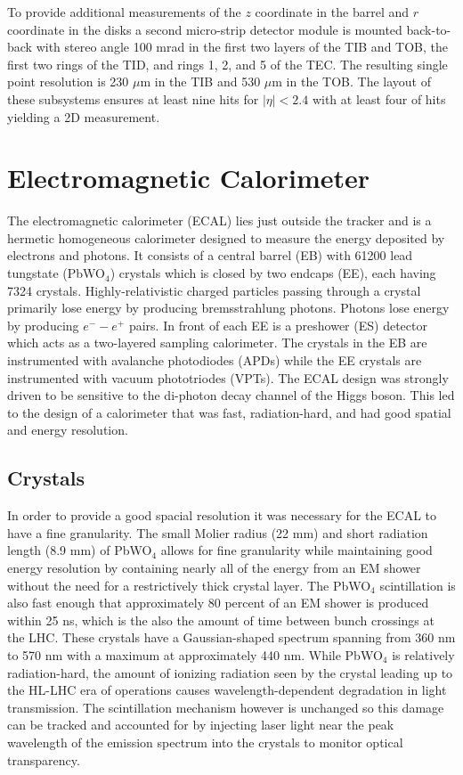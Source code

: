 To provide additional measurements of the $z$ coordinate in the barrel and $r$ coordinate in the disks a second micro-strip detector module is mounted back-to-back with stereo angle 100 mrad in the first two layers of the TIB and TOB, the first two rings of the TID, and rings 1, 2, and 5 of the TEC.  The resulting single point resolution is 230 $\mu$m in the TIB and 530 $\mu$m in the TOB.  The layout of these subsystems ensures at least nine hits for $|\eta| < 2.4$ with at least four of hits yielding a 2D measurement.



\section{Electromagnetic Calorimeter}

The electromagnetic calorimeter (ECAL) lies just outside the tracker and is a hermetic homogeneous calorimeter designed to measure the energy deposited by electrons and photons.  It consists of a central barrel (EB) with 61200 lead tungstate (PbWO$_{4}$) crystals which is closed by two endcaps (EE), each having 7324 crystals.  Highly-relativistic charged particles passing through a crystal primarily lose energy by producing bremsstrahlung photons.  Photons lose energy by producing $e^{-}-e^{+}$ pairs.  In front of each EE is a preshower (ES) detector which acts as a two-layered sampling calorimeter.  The crystals in the EB are instrumented with avalanche photodiodes (APDs) while the EE crystals are instrumented with vacuum phototriodes (VPTs). The ECAL design was strongly driven to be sensitive to the di-photon decay channel of the Higgs boson.  This led to the design of a calorimeter that was fast, radiation-hard, and had good spatial and energy resolution.  




\subsection{Crystals}
In order to provide a good spacial resolution it was necessary for the ECAL to have a fine granularity. The small Molier radius (22 mm) and short radiation length (8.9 mm) of PbWO$_{4}$ allows for fine granularity while maintaining good energy resolution by containing nearly all of the energy from an EM shower without the need for a restrictively thick crystal layer.  The PbWO$_{4}$ scintillation is also fast enough that approximately 80 percent of an EM shower is produced within 25 ns, which is the also the amount of time between bunch crossings at the LHC.  These crystals have a Gaussian-shaped spectrum spanning from 360 nm to 570 nm with a maximum at approximately 440 nm.  While PbWO$_{4}$ is relatively radiation-hard, the amount of ionizing radiation seen by the crystal leading up to the HL-LHC era of operations causes wavelength-dependent degradation in light transmission.  The scintillation mechanism however is unchanged so this damage can be tracked and accounted for by injecting laser light near the peak wavelength of the emission spectrum into the crystals to monitor optical transparency.


